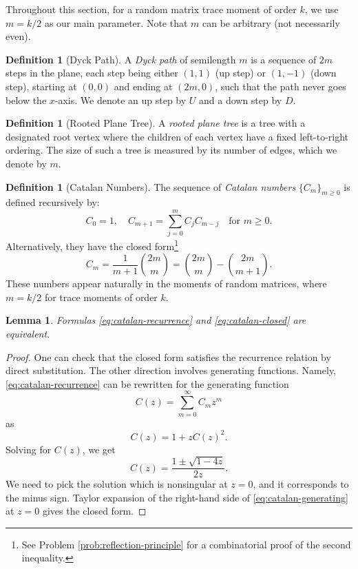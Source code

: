 \documentclass[letterpaper,11pt,oneside,reqno]{article}
\numberwithin{equation}{section}
\newtheorem{lemma}[proposition]{Lemma}
\theoremstyle{definition}
\newtheorem{definition}[proposition]{Definition}
\begin{document}
Throughout this section, for a random matrix trace moment of order $k$,
we use $m=k/2$ as our main parameter. Note that $m$ can be arbitrary
(not necessarily even).

\begin{definition}[Dyck Path]
A \emph{Dyck path} of semilength $m$ is a sequence of $2m$ steps in the plane, each step being either $(1,1)$ (up step) or $(1,-1)$ (down step), starting at $(0,0)$ and ending at $(2m,0)$, such that the path never goes below the $x$-axis. We denote an up step by $U$ and a down step by $D$.
\end{definition}

\begin{definition}[Rooted Plane Tree]
A \emph{rooted plane tree} is a tree with a designated root vertex where the children of each vertex have a fixed left-to-right ordering. The size of such a tree is measured by its number of edges, which we denote by $m$.
\end{definition}

\begin{definition}[Catalan Numbers]
The sequence of \emph{Catalan numbers} $\{C_m\}_{m\geq 0}$ is defined recursively by:
\begin{equation}
	\label{eq:catalan-recurrence}
    C_0 = 1, \quad C_{m+1} = \sum_{j=0}^m C_j C_{m-j} \quad \text{for } m \geq 0.
\end{equation}
Alternatively, they have the closed form\footnote{See 
	Problem \ref{prob:reflection-principle} for a combinatorial proof
of the second inequality.}
\begin{equation}
	\label{eq:catalan-closed}
    C_m = \frac{1}{m+1}\binom{2m}{m} =
		\binom{2m}{m} - \binom{2m}{m+1}.
\end{equation}
These numbers appear naturally in the moments of random matrices, where $m=k/2$ for trace moments of order $k$.
\end{definition}

\begin{lemma}
	\label{lemma:equivalence-catalan}
	Formulas
	\eqref{eq:catalan-recurrence} and \eqref{eq:catalan-closed} are equivalent.
\end{lemma}
\begin{proof}
	One can check that the closed form satisfies the recurrence relation by direct substitution. The other direction
	involves generating functions. Namely,
	\eqref{eq:catalan-recurrence} can be rewritten for the
	generating function
	\begin{equation*}
		C(z)=\sum_{m=0}^\infty C_m z^m
	\end{equation*}
	as
	\begin{equation*}
		C(z)=1+zC(z)^2.
	\end{equation*}
	Solving for $C(z)$, we get
	\begin{equation}
		\label{eq:catalan-generating}
		C(z)=\frac{1\pm \sqrt{1-4z}}{2z}.
	\end{equation}
	We need to pick the solution which is nonsingular at $z=0$,
	and it corresponds to the minus sign.
	Taylor expansion of the right-hand side of
	\eqref{eq:catalan-generating}
	at $z=0$
	gives the closed form.
\end{proof}
\end{document}
